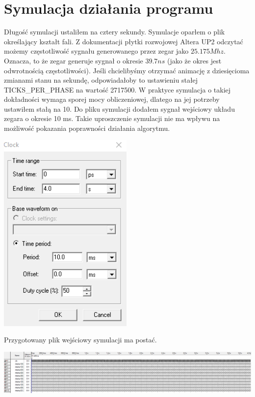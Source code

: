 \documentclass{article}
\begin{document}
    \section{Symulacja działania programu}
        Długość symulacji ustaliłem na cztery sekundy. Symulacje oparłem o plik określający kształt fali. Z dokumentacji płytki rozwojowej Altera UP2 odczytać możemy częstotliwość sygnału generowanego przez zegar jako $25.175Mhz$. Oznacza, to że zegar generuje sygnał o okresie $39.7ns$ (jako że okres jest odwrotnością częstotliwości). Jeśli chcielibyśmy otrzymać animację z dziesięcioma zmianami stanu na sekundę, odpowiadałoby to ustawieniu stałej TICKS\_PER\_PHASE na wartość 2717500. W praktyce symulacja o takiej dokładności wymaga sporej mocy obliczeniowej, dlatego na jej potrzeby ustawiłem stałą na 10. Do pliku symulacji dodałem sygnał wejściowy układu zegara o okresie 10 ms. Takie uproszczenie symulacji nie ma wpływu na możliwość pokazania poprawności działania algorytmu. 
        \begin{center}
            \includegraphics[height=10cm]{reports/img/fpga_clock.png}\\
        \end{center}
        \FloatBarrier
        Przygotowany plik wejściowy symulacji ma postać.
        \begin{center}
            \includegraphics[width=18cm]{reports/img/fpga_sim_in.png}\\
        \end{center}
\end{document}
